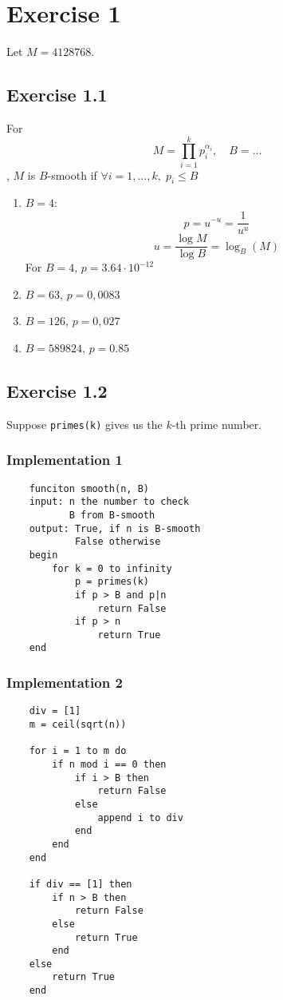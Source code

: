 \documentclass[a4paper]{scrreprt}
\begin{document}
\section*{Exercise 1}

Let $M=4128768$.

\subsection*{Exercise 1.1}

For \[M=\prod_{i=1}^k p_i^{\alpha_i},\quad B=\hdots\], $M$ is $B$-smooth if $\forall i=1,\hdots,k,\;p_i\leq B$

\begin{enumerate}[label=(\alph*)]
    \item $B=4$: 
        \[p = u^{-u} = \frac 1 {u^u}\]
        \[u=\frac{\log M}{\log B}=\log_B(M)\]
        For $B=4$, $p=3.64\cdot 10^{-12}$
    \item $B=63$, $p=0,0083$
    \item $B=126$, $p=0,027$
    \item $B=589824$, $p=0.85$
\end{enumerate}

\subsection*{Exercise 1.2}

Suppose \lstinline{primes(k)} gives us the $k$-th prime number.

\subsubsection*{Implementation 1}
\begin{lstlisting}
    funciton smooth(n, B)
    input: n the number to check
           B from B-smooth
    output: True, if n is B-smooth
            False otherwise
    begin
        for k = 0 to infinity
            p = primes(k)
            if p > B and p|n
                return False
            if p > n
                return True
    end
\end{lstlisting}

\subsubsection*{Implementation 2}
\begin{lstlisting}
    div = [1]
    m = ceil(sqrt(n))

    for i = 1 to m do
        if n mod i == 0 then
            if i > B then
                return False
            else
                append i to div
            end
        end
    end

    if div == [1] then
        if n > B then
            return False
        else
            return True
        end
    else
        return True
    end
\end{lstlisting}
\end{document}
